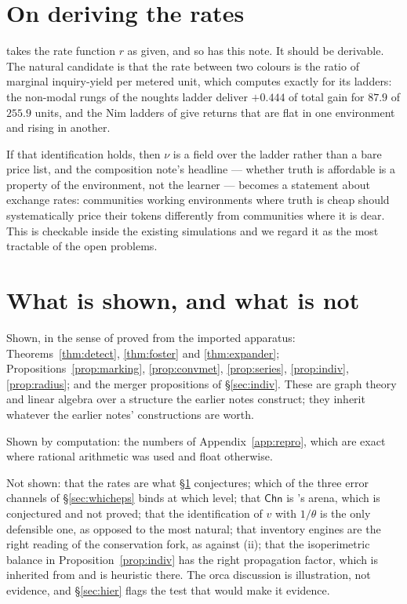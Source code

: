 \documentclass[11pt]{article}
\theoremstyle{plain}
\theoremstyle{definition}
\theoremstyle{remark}
\newcommand{\Chn}{\mathsf{Chn}}
\begin{document}
\section{On deriving the rates}
\label{sec:rates}

\cite{vtok} takes the rate function $r$ as given, and so has this note. It
should be derivable. The natural candidate is that the rate between two
colours is the ratio of marginal inquiry-yield per metered unit, which
\cite{game} computes exactly for its ladders: the non-modal rungs of the
noughts ladder deliver $+0.444$ of total gain for $87.9$ of $255.9$ units,
and the Nim ladders of \cite{compose} give returns that are flat in one
environment and rising in another.

If that identification holds, then $\nu$ is a field over the ladder rather
than a bare price list, and the composition note's headline --- whether
truth is affordable is a property of the environment, not the learner ---
becomes a statement about exchange rates: communities working environments
where truth is cheap should systematically price their tokens differently
from communities where it is dear. This is checkable inside the existing
simulations and we regard it as the most tractable of the open problems.

\section{What is shown, and what is not}

Shown, in the sense of proved from the imported apparatus:
Theorems~\ref{thm:detect}, \ref{thm:foster} and \ref{thm:expander};
Propositions~\ref{prop:marking}, \ref{prop:convmet}, \ref{prop:series},
\ref{prop:indiv}, \ref{prop:radius}; and the merger propositions of
\S\ref{sec:indiv}. These are graph theory and linear algebra over a
structure the earlier notes construct; they inherit whatever the earlier
notes' constructions are worth.

Shown by computation: the numbers of Appendix~\ref{app:repro}, which are
exact where rational arithmetic was used and float otherwise.

Not shown: that the rates are what \S\ref{sec:rates} conjectures; which of
the three error channels of \S\ref{sec:whicheps} binds at which level;
that $\Chn$ is \cite{compose}'s arena, which is
conjectured and not proved; that the
identification of $v$ with $1/\theta$ is the only defensible one, as
opposed to the most natural; that inventory engines are the right reading
of the conservation fork, as against (ii); that the isoperimetric balance
in Proposition~\ref{prop:indiv} has the right propagation factor, which is
inherited from \cite{compaut} and is heuristic there. The orca discussion
is illustration, not evidence, and \S\ref{sec:hier} flags the test that
would make it evidence.
\end{document}
